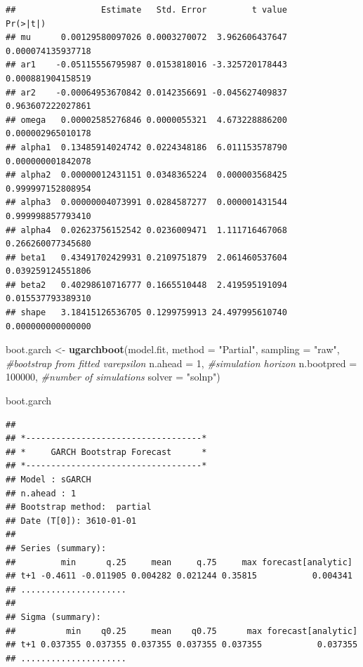 \documentclass[
]{book}
\newenvironment{Shaded}{\begin{snugshade}}{\end{snugshade}}
\newcommand{\AttributeTok}[1]{\textcolor[rgb]{0.13,0.29,0.53}{#1}}
\newcommand{\CommentTok}[1]{\textcolor[rgb]{0.56,0.35,0.01}{\textit{#1}}}
\newcommand{\DecValTok}[1]{\textcolor[rgb]{0.00,0.00,0.81}{#1}}
\newcommand{\FunctionTok}[1]{\textcolor[rgb]{0.13,0.29,0.53}{\textbf{#1}}}
\newcommand{\NormalTok}[1]{#1}
\newcommand{\OtherTok}[1]{\textcolor[rgb]{0.56,0.35,0.01}{#1}}
\newcommand{\StringTok}[1]{\textcolor[rgb]{0.31,0.60,0.02}{#1}}
\begin{document}
\begin{verbatim}
##                 Estimate   Std. Error         t value          Pr(>|t|)
## mu      0.00129580097026 0.0003270072  3.962606437647 0.000074135937718
## ar1    -0.05115556795987 0.0153818016 -3.325720178443 0.000881904158519
## ar2    -0.00064953670842 0.0142356691 -0.045627409837 0.963607222027861
## omega   0.00002585276846 0.0000055321  4.673228886200 0.000002965010178
## alpha1  0.13485914024742 0.0224348186  6.011153578790 0.000000001842078
## alpha2  0.00000012431151 0.0348365224  0.000003568425 0.999997152808954
## alpha3  0.00000004073991 0.0284587277  0.000001431544 0.999998857793410
## alpha4  0.02623756152542 0.0236009471  1.111716467068 0.266260077345680
## beta1   0.43491702429931 0.2109751879  2.061460537604 0.039259124551806
## beta2   0.40298610716777 0.1665510448  2.419595191094 0.015537793389310
## shape   3.18415126536705 0.1299759913 24.497995610740 0.000000000000000
\end{verbatim}

\begin{Shaded}
\begin{Highlighting}[]
\NormalTok{boot.garch }\OtherTok{\textless{}{-}} \FunctionTok{ugarchboot}\NormalTok{(model.fit,}
                         \AttributeTok{method =} \StringTok{"Partial"}\NormalTok{,}
                         \AttributeTok{sampling =} \StringTok{"raw"}\NormalTok{,  }\CommentTok{\#bootstrap from fitted varepsilon}
                         \AttributeTok{n.ahead =} \DecValTok{1}\NormalTok{,          }\CommentTok{\#simulation horizon}
                         \AttributeTok{n.bootpred =} \DecValTok{100000}\NormalTok{, }\CommentTok{\#number of simulations }
                         \AttributeTok{solver =} \StringTok{"solnp"}\NormalTok{)}

\NormalTok{boot.garch}
\end{Highlighting}
\end{Shaded}

\begin{verbatim}
## 
## *-----------------------------------*
## *     GARCH Bootstrap Forecast      *
## *-----------------------------------*
## Model : sGARCH
## n.ahead : 1
## Bootstrap method:  partial
## Date (T[0]): 3610-01-01
## 
## Series (summary):
##         min      q.25     mean     q.75     max forecast[analytic]
## t+1 -0.4611 -0.011905 0.004282 0.021244 0.35815           0.004341
## .....................
## 
## Sigma (summary):
##          min    q0.25     mean    q0.75      max forecast[analytic]
## t+1 0.037355 0.037355 0.037355 0.037355 0.037355           0.037355
## .....................
\end{verbatim}
\end{document}

